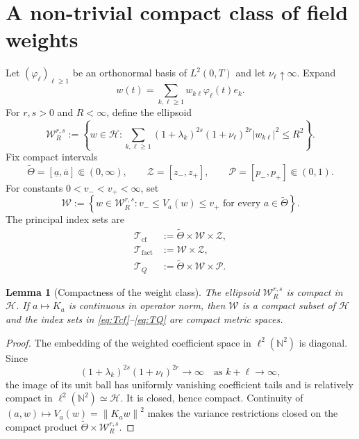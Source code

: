 \documentclass[11pt]{article}
\newtheorem{lemma}[assumption]{Lemma}
\theoremstyle{remark}
\newcommand{\N}{\mathbb N}
\newcommand{\cf}{\mathrm{cf}}
\newcommand{\fact}{\mathrm{fact}}
\newcommand{\cH}{\mathcal H}
\newcommand{\cW}{\mathcal W}
\newcommand{\cT}{\mathcal T}
\newcommand{\cZ}{\mathcal Z}
\newcommand{\cP}{\mathcal P}
\newcommand{\norm}[1]{\left\lVert #1\right\rVert}
\newcommand{\abs}[1]{\left\lvert #1\right\rvert}
\begin{document}
\section{A non-trivial compact class of field weights}

Let $(\varphi_\ell)_{\ell\ge1}$ be an orthonormal basis of $L^2(0,T)$ and let $\nu_\ell\uparrow\infty$.  Expand
\[
 w(t)=\sum_{k,\ell\ge1}w_{k\ell}\varphi_\ell(t)e_k.
\]
For $r,s>0$ and $R<\infty$, define the ellipsoid
\begin{equation}\label{eq:ellipsoid}
 \cW_R^{r,s}
 :=\left\{
 w\in\cH:
 \sum_{k,\ell\ge1}
 (1+\lambda_k)^{2s}(1+\nu_\ell)^{2r}
 \abs{w_{k\ell}}^2\le R^2
 \right\}.
\end{equation}
Fix compact intervals
\[
 \widetilde\Theta=[\underline a,\overline a]\Subset(0,\infty),
 \qquad
 \cZ=[z_-,z_+],
 \qquad
 \cP=[p_-,p_+]\Subset(0,1).
\]
For constants $0<v_-<v_+<\infty$, set
\begin{equation}\label{eq:W-nondegenerate}
 \cW
 :=\left\{
 w\in\cW_R^{r,s}:
 v_-\le V_a(w)\le v_+
 \text{ for every }a\in\widetilde\Theta
 \right\}.
\end{equation}
The principal index sets are
\begin{align}
 \cT_{\cf}&:=\widetilde\Theta\times\cW\times\cZ,\label{eq:Tcf}\\
 \cT_{\fact}&:=\cW\times\cZ,\label{eq:Tfact}\\
 \cT_Q&:=\widetilde\Theta\times\cW\times\cP.\label{eq:TQ}
\end{align}

\begin{lemma}[Compactness of the weight class]\label{lem:compact-W}
The ellipsoid $\cW_R^{r,s}$ is compact in $\cH$.  If $a\mapsto K_a$ is continuous in operator norm, then $\cW$ is a compact subset of $\cH$ and the index sets in \eqref{eq:Tcf}--\eqref{eq:TQ} are compact metric spaces.
\end{lemma}

\begin{proof}
The embedding of the weighted coefficient space in $\ell^2(\N^2)$ is diagonal.  Since
\[
 (1+\lambda_k)^{2s}(1+\nu_\ell)^{2r}\to\infty
 \quad\text{as }k+\ell\to\infty,
\]
the image of its unit ball has uniformly vanishing coefficient tails and is relatively compact in $\ell^2(\N^2)\simeq\cH$.  It is closed, hence compact.  Continuity of $(a,w)\mapsto V_a(w)=\norm{K_aw}^2$ makes the variance restrictions closed on the compact product $\widetilde\Theta\times\cW_R^{r,s}$.
\end{proof}
\end{document}
